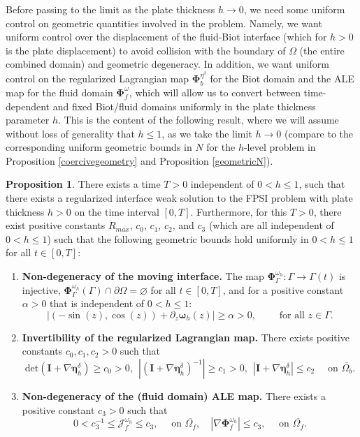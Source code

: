 \documentclass[11pt]{article}
\newcommand{\bd}{\boldsymbol}
\theoremstyle{definition}
\newtheorem{proposition}{Proposition}[section]
\begin{document}
Before passing to the limit as the plate thickness $h \to 0$, we need some uniform control on geometric quantities involved in the problem. Namely, we want uniform control over the displacement of the fluid-Biot interface (which for $h > 0$ is the plate displacement) to avoid collision with the boundary of $\Omega$ (the entire combined domain) and geometric degeneracy. In addition, we want uniform control on the regularized Lagrangian map $\bd{\Phi}^{\eta^{\delta}}_{b}$ for the Biot domain and the ALE map for the fluid domain $\bd{\Phi}^{\omega}_{f}$, which will allow us to convert between time-dependent and fixed Biot/fluid domains uniformly in the plate thickness parameter $h$. This is the content of the following result, where we will assume without loss of generality that $h \le 1$, as we take the limit $h \to 0$ (compare to the corresponding uniform geometric bounds in $N$ for the $h$-level problem in Proposition \ref{coercivegeometry} and Proposition \ref{geometricN}). 

\begin{proposition}\label{geometryh}
There exists a time $T > 0$ independent of $0 < h \le 1$, such that there exists a regularized interface weak solution to the FPSI problem with plate thickness $h > 0$ on the time interval $[0, T]$. Furthermore, for this $T > 0$, there exist positive constants $R_{max}$, $c_{0}$, $c_{1}$, $c_{2}$, and $c_{3}$ (which are all independent of $0 < h \le 1$) such that the following geometric bounds hold uniformly in $0 < h \le 1$ for all $t \in [0, T]$:
\begin{enumerate}
\item \textbf{Non-degeneracy of the moving interface.} The map $\bd{\Phi}^{\omega_{h}}_{\Gamma}: \Gamma \to \Gamma(t)$ is injective, $\bd{\Phi}^{\omega_{h}}_{\Gamma}(\Gamma) \cap \partial \Omega = \varnothing$ for all $t \in [0, T]$, and for a positive constant $\alpha > 0$ that is independent of $0 < h \le 1$:
\begin{equation}\label{thbound}
|(-\sin(z), \cos(z)) + \partial_{z}\bd{\omega}_{h}(z)| \ge \alpha > 0, \qquad \text{ for all } z \in \Gamma.
\end{equation}
\item \textbf{Invertibility of the regularized Lagrangian map.} There exists positive constants $c_{0}, c_{1}, c_{2} > 0$ such that 
\begin{equation*}
\text{det}(\bd{I} + \nabla \bd{\eta}^{\delta}_{h}) \ge c_{0} > 0, \ \ |(\bd{I} + \nabla \bd{\eta}^{\delta}_{h})^{-1}| \ge c_{1} > 0, \ \  |\bd{I} + \nabla \bd{\eta}^{\delta}_{h}| \le c_{2} \quad \text{ on } \overline{\Omega_{b}}.
\end{equation*}
\item \textbf{Non-degeneracy of the (fluid domain) ALE map.} There exists a positive constant $c_{3} > 0$ such that 
\begin{equation*}
0 < c_{3}^{-1} \le \mathcal{J}^{\omega_{h}}_{f} \le c_{3}, \quad \text{ on } \overline{\Omega_{f}}, \quad |\nabla \bd{\Phi}^{\omega_{h}}_{f}| \le c_{3}, \quad \text{ on } \overline{\Omega_{f}}. 
\end{equation*}
\end{enumerate}
\end{proposition}
\end{document}
